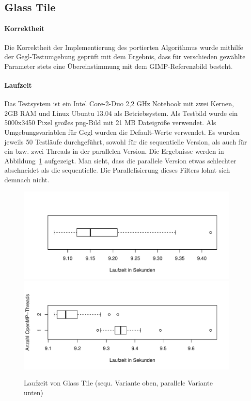 \subsection{Glass Tile}
\paragraph{Korrektheit}
Die Korrektheit der Implementierung des portierten Algorithmus wurde mithilfe der Gegl-Testumgebung geprüft mit dem Ergebnis, dass für verschieden gewählte Parameter stets eine Übereinstimmung mit dem GIMP-Referenzbild besteht.

\paragraph{Laufzeit}
Das Testsystem ist ein Intel Core-2-Duo 2,2 GHz Notebook mit zwei Kernen, 2GB RAM und Linux Ubuntu 13.04 als Betriebsystem. Als Testbild wurde ein 5000x3450 Pixel großes png-Bild mit 21 MB Dateigröße verwendet. Als Umgebungsvariablen für Gegl wurden die Default-Werte verwendet. Es wurden jeweils 50 Testläufe durchgeführt, sowohl für die sequentielle Version, als auch für ein bzw. zwei Threads in der parallelen Version. Die Ergebnisse werden in Abbildung~\ref{fig:gtile-runs} aufgezeigt. Man sieht, dass die parallele Version etwas schlechter abschneidet als die sequentielle. Die Parallelisierung dieses Filters lohnt sich demnach nicht.

\begin{figure}[h]
\begin{center}
\includegraphics[width=1.0\textwidth]{graphs/glass-tile_seq.pdf}\newline
\includegraphics[width=1.0\textwidth]{graphs/glass-tile_2threads.pdf}
\end{center}
\caption{Laufzeit von Glass Tile (sequ. Variante oben, parallele Variante unten)}\label{fig:gtile-runs}
\end{figure}

